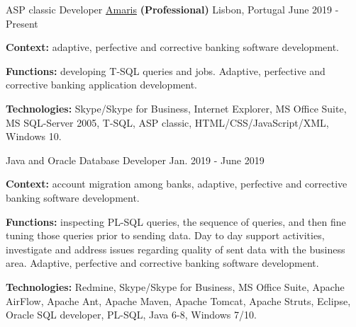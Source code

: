 \begin{cventries}

\vspace{-0.25cm}

  \cventry
    {ASP classic Developer} %
    {\href{https://www.amaris.com/}{Amaris} \textbf{(Professional)}} %
    {Lisbon, Portugal} %
    {June 2019 - Present} %
    {
      \begin{cvitems} %
		\item[] {\textbf{Context:} adaptive, perfective and corrective banking software development. 
}
		\item[] {\textbf{Functions:} developing T-SQL queries and jobs. Adaptive, perfective and corrective banking application development.}		
		\item[] {\textbf{Technologies:} \textcolor{rainbowcolor-olive}{Skype/Skype for Business}, \textcolor{rainbowcolor-olive}{Internet Explorer}, \textcolor{rainbowcolor-olive}{MS Office Suite}, \textcolor{rainbowcolor-olive}{MS SQL-Server 2005}, \textcolor{rainbowcolor-indigo}{T-SQL}, \textcolor{rainbowcolor-indigo}{ASP classic}, \textcolor{rainbowcolor-indigo}{HTML/CSS/JavaScript/XML},  \textcolor{rainbowcolor-orange}{Windows 10}.}		
      \end{cvitems}
    } 
    
  \cventry
    {Java and Oracle Database Developer} %
    {} %
    {} %
    {Jan. 2019 - June 2019} %
    {
      \begin{cvitems} %
		\item[] {\textbf{Context:} account migration among banks, adaptive, perfective and corrective banking software development. 
}
		\item[] {\textbf{Functions:} inspecting PL-SQL queries, the sequence of queries, and then fine tuning those queries prior to sending data. Day to day support activities, investigate and address issues regarding quality of sent data with the business area. Adaptive, perfective and corrective banking software development.}		
		\item[] {\textbf{Technologies:} \textcolor{rainbowcolor-olive}{Redmine}, \textcolor{rainbowcolor-olive}{Skype/Skype for Business}, \textcolor{rainbowcolor-olive}{MS Office Suite}, \textcolor{rainbowcolor-olive}{Apache AirFlow}, \textcolor{rainbowcolor-olive}{Apache Ant}, \textcolor{rainbowcolor-olive}{Apache Maven}, \textcolor{rainbowcolor-olive}{Apache Tomcat}, \textcolor{rainbowcolor-olive}{Apache Struts}, \textcolor{rainbowcolor-olive}{Eclipse}, \textcolor{rainbowcolor-olive}{Oracle SQL developer}, \textcolor{rainbowcolor-indigo}{PL-SQL}, \textcolor{rainbowcolor-indigo}{Java 6-8}, \textcolor{rainbowcolor-orange}{Windows 7/10}.}		
      \end{cvitems}
    } 
    

\end{cventries}
